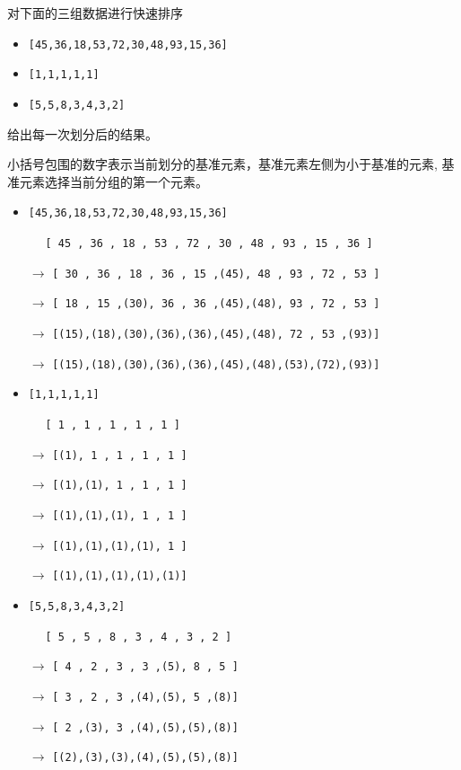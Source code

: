\documentclass[../../main.tex]{subfiles}
\begin{document}
\begin{problem}
对下面的三组数据进行快速排序
\begin{itemize}
\item \verb|[45,36,18,53,72,30,48,93,15,36]|
\item \verb|[1,1,1,1,1]|
\item \verb|[5,5,8,3,4,3,2]|
\end{itemize}
给出每一次划分后的结果。
\end{problem}
\begin{solution}
    小括号包围的数字表示当前划分的基准元素，基准元素左侧为小于基准的元素, 基准元素选择当前分组的第一个元素。
\begin{itemize}
\item \verb|[45,36,18,53,72,30,48,93,15,36]|

    $\quad$       \verb|[ 45 , 36 , 18 , 53 , 72 , 30 , 48 , 93 , 15 , 36 ]|

    $\rightarrow$ \verb|[ 30 , 36 , 18 , 36 , 15 ,(45), 48 , 93 , 72 , 53 ]|

    $\rightarrow$ \verb|[ 18 , 15 ,(30), 36 , 36 ,(45),(48), 93 , 72 , 53 ]|

    $\rightarrow$ \verb|[(15),(18),(30),(36),(36),(45),(48), 72 , 53 ,(93)]|

    $\rightarrow$ \verb|[(15),(18),(30),(36),(36),(45),(48),(53),(72),(93)]|


\item \verb|[1,1,1,1,1]|

    $\quad$       \verb|[ 1 , 1 , 1 , 1 , 1 ]| 

    $\rightarrow$ \verb|[(1), 1 , 1 , 1 , 1 ]|

    $\rightarrow$ \verb|[(1),(1), 1 , 1 , 1 ]|

    $\rightarrow$ \verb|[(1),(1),(1), 1 , 1 ]|

    $\rightarrow$ \verb|[(1),(1),(1),(1), 1 ]|

    $\rightarrow$ \verb|[(1),(1),(1),(1),(1)]|


\item \verb|[5,5,8,3,4,3,2]|

    $\quad$       \verb|[ 5 , 5 , 8 , 3 , 4 , 3 , 2 ]|

    $\rightarrow$ \verb|[ 4 , 2 , 3 , 3 ,(5), 8 , 5 ]|

    $\rightarrow$ \verb|[ 3 , 2 , 3 ,(4),(5), 5 ,(8)]|

    $\rightarrow$ \verb|[ 2 ,(3), 3 ,(4),(5),(5),(8)]|

    $\rightarrow$ \verb|[(2),(3),(3),(4),(5),(5),(8)]|

\end{itemize}
\end{solution}
\end{document}
